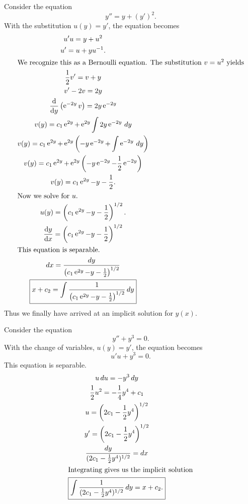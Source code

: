 \begin{Example}
  Consider the equation
  \[ y'' = y + (y')^2.\]
  With the substitution $u(y) = y'$, the equation becomes
  \begin{gather*}
    u' u = y + u^2 \\
    u' = u + y u^{-1}. \\
    \intertext{We recognize this as a Bernoulli equation.  
      The substitution $v = u^2$ yields}
    \frac{1}{2} v' = v + y \\
    v' - 2v = 2y \\
    \frac{\mathrm{d}}{\mathrm{d} y} \left(\mathop{\mathrm{e}}\nolimits^{-2y} v\right) = 2y \mathop{\mathrm{e}}\nolimits^{-2y} \\
    v(y) = c_1 \mathop{\mathrm{e}}\nolimits^{2y} + \mathop{\mathrm{e}}\nolimits^{2y}\int 2y \mathop{\mathrm{e}}\nolimits^{-2y}\,d y \\
    v(y) = c_1 \mathop{\mathrm{e}}\nolimits^{2y} + \mathop{\mathrm{e}}\nolimits^{2y}\left( -y \mathop{\mathrm{e}}\nolimits^{-2y} + 
      \int \mathop{\mathrm{e}}\nolimits^{-2y}\,d y \right) \\
    v(y) = c_1 \mathop{\mathrm{e}}\nolimits^{2y} + \mathop{\mathrm{e}}\nolimits^{2y}\left( -y \mathop{\mathrm{e}}\nolimits^{-2y} - \frac{1}{2} \mathop{\mathrm{e}}\nolimits^{-2y}\right)\\
    v(y) = c_1 \mathop{\mathrm{e}}\nolimits^{2y} - y - \frac{1}{2}. \\
    \intertext{Now we solve for $u$.}
    u(y) = \left(c_1 \mathop{\mathrm{e}}\nolimits^{2y} - y - \frac{1}{2}\right)^{1/2}. \\
    \frac{\mathrm{d} y}{\mathrm{d} x} = \left(c_1 \mathop{\mathrm{e}}\nolimits^{2y} - y - \frac{1}{2}\right)^{1/2} \\
    \intertext{This equation is separable.}
    d x = \frac{d y}{\left(c_1 \mathop{\mathrm{e}}\nolimits^{2y} - y - \frac{1}{2}\right)^{1/2}} \\
    \boxed{ x + c_2 = \int \frac{1}{\left(c_1 \mathop{\mathrm{e}}\nolimits^{2y} - y - \frac{1}{2}
        \right)^{1/2}}\,d y }
  \end{gather*}
  Thus we finally have arrived at an implicit solution for $y(x)$.
\end{Example}




\begin{Example}
  Consider the equation
  \[y'' + y^3 = 0.\]
  With the change of variables, $u(y) = y'$, the equation becomes
  \[ u' u + y^3 = 0. \]
  This equation is separable.
  \begin{gather*}
    u\,d u = - y^3\,d y \\
    \frac{1}{2} u^2 = - \frac{1}{4} y^4 + c_1 \\
    u = \left( 2c_1 -\frac{1}{2} y^4 \right)^{1/2} \\
    y' = \left( 2c_1 -\frac{1}{2} y^4 \right)^{1/2} \\
    \frac{d y}{(2c_1 -\frac{1}{2} y^4 )^{1/2}} = d x \\
    \intertext{Integrating gives us the implicit solution}
    \boxed{ \int \frac{1}{(2c_1 -\frac{1}{2} y^4 )^{1/2}}\,d y = x + c_2 .}
  \end{gather*}
\end{Example}













